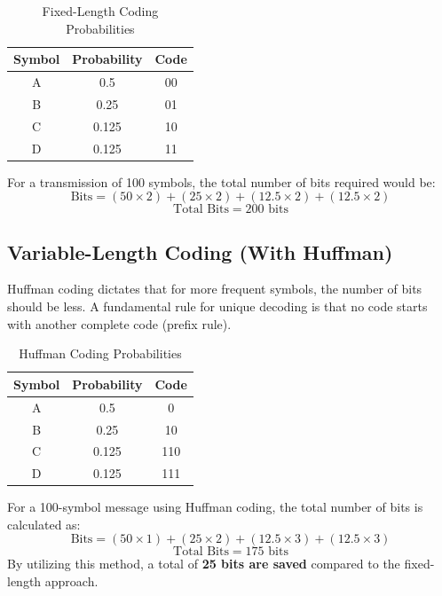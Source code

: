 \documentclass[10pt, conference]{IEEEtran}
\begin{document}
\begin{table}[h]
\centering
\caption{Fixed-Length Coding Probabilities}
\begin{tabular}{ccc}
\toprule
\textbf{Symbol} & \textbf{Probability} & \textbf{Code} \\
\midrule
A & 0.5   & 00 \\
B & 0.25  & 01 \\
C & 0.125 & 10 \\
D & 0.125 & 11 \\
\bottomrule
\end{tabular}
\end{table}

For a transmission of 100 symbols, the total number of bits required would be:
\begin{equation}
\text{Bits} = (50 \times 2) + (25 \times 2) + (12.5 \times 2) + (12.5 \times 2)
\end{equation}
\begin{equation}
\text{Total Bits} = 200 \text{ bits}
\end{equation}

\subsection{\textbf{Variable-Length Coding (With Huffman)}}
Huffman coding dictates that for more frequent symbols, the number of bits should be less. A fundamental rule for unique decoding is that no code starts with another complete code (prefix rule).

\begin{table}[h]
\centering
\caption{Huffman Coding Probabilities}
\begin{tabular}{ccc}
\toprule
\textbf{Symbol} & \textbf{Probability} & \textbf{Code} \\
\midrule
A & 0.5   & 0 \\
B & 0.25  & 10 \\
C & 0.125 & 110 \\
D & 0.125 & 111 \\
\bottomrule
\end{tabular}
\end{table}

For a 100-symbol message using Huffman coding, the total number of bits is calculated as:
\begin{equation}
\text{Bits} = (50 \times 1) + (25 \times 2) + (12.5 \times 3) + (12.5 \times 3)
\end{equation}
\begin{equation}
\text{Total Bits} = 175 \text{ bits}
\end{equation}
By utilizing this method, a total of \textbf{25 bits are saved} compared to the fixed-length approach.
\end{document}
